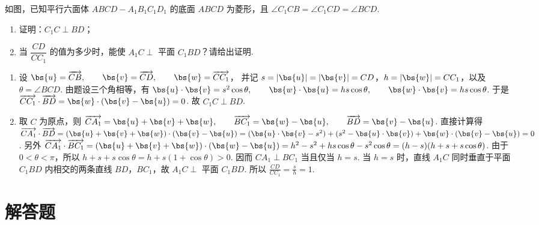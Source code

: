 \reuseproblemnumber
\begin{problem}[乙]
如图，已知平行六面体 \(ABCD - A_{1}B_{1}C_{1}D_{1}\) 的底面 \(ABCD\) 为菱形，且 \(\angle C_{1}CB = \angle C_{1}CD = \angle BCD\).

\begin{enumerate}
\item 证明：\(C_{1}C \perp BD\)；
\item 当 \(\dfrac{CD}{CC_{1}}\) 的值为多少时，能使 \(A_{1}C \perp\) 平面 \(C_{1}BD\)？请给出证明.
\end{enumerate}

\begingroup
\leftskip=0pt\relax
\rightskip=0pt\relax
{}
\endgroup
\end{problem}

\begin{solution}
\begin{enumerate}
\item 设
\(
\bs{u}=\overrightarrow{CB},\qquad \bs{v}=\overrightarrow{CD},\qquad \bs{w}=\overrightarrow{CC_{1}}
\)，
并记 \(s=|\bs{u}|=|\bs{v}|=CD\)，\(h=|\bs{w}|=CC_{1}\)，以及 \(\theta=\angle BCD\). 由题设三个角相等，有
\(
\bs{u}\cdot\bs{v}=s^{2}\cos\theta,\qquad
\bs{w}\cdot\bs{u}=hs\cos\theta,\qquad
\bs{w}\cdot\bs{v}=hs\cos\theta
\).
于是
\(
\overrightarrow{CC_{1}}\cdot\overrightarrow{BD}
=\bs{w}\cdot(\bs{v}-\bs{u})
=0
\).
故 \(C_{1}C\perp BD\).

\item 取 \(C\) 为原点，则
\(
\overrightarrow{CA_{1}}=\bs{u}+\bs{v}+\bs{w},\qquad
\overrightarrow{BC_{1}}=\bs{w}-\bs{u},\qquad
\overrightarrow{BD}=\bs{v}-\bs{u}
\).
直接计算得
\(
\overrightarrow{CA_{1}}\cdot\overrightarrow{BD}
=(\bs{u}+\bs{v}+\bs{w})\cdot(\bs{v}-\bs{u})
=(\bs{u}\cdot\bs{v}-s^{2})+(s^{2}-\bs{u}\cdot\bs{v})+\bs{w}\cdot(\bs{v}-\bs{u})=0
\).
另外
\(\overrightarrow{CA_{1}}\cdot\overrightarrow{BC_{1}}=(\bs{u}+\bs{v}+\bs{w})\cdot(\bs{w}-\bs{u})=h^{2}-s^{2}+hs\cos\theta-s^{2}\cos\theta=(h-s)(h+s+s\cos\theta)\).
由于 \(0<\theta<\pi\)，所以 \(h+s+s\cos\theta=h+s(1+\cos\theta)>0\). 因而 \(CA_{1}\perp BC_{1}\) 当且仅当 \(h=s\). 当 \(h=s\) 时，直线 \(A_{1}C\) 同时垂直于平面 \(C_{1}BD\) 内相交的两条直线 \(BD\)，\(BC_{1}\)，故
\(
A_{1}C\perp\text{ 平面 }C_{1}BD
\).
所以
\(
\frac{CD}{CC_{1}}=\frac{s}{h}=1
\).
\end{enumerate}
\end{solution}

\section{解答题}

